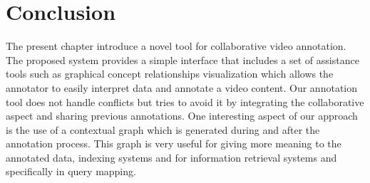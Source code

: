 \section{Conclusion}

The present chapter introduce a novel tool for collaborative video annotation. The proposed system provides a simple interface that includes a set of assistance tools such as graphical concept relationships visualization which allows the annotator to easily interpret data and annotate a video content. Our annotation tool does not handle conflicts but tries to avoid it by integrating the collaborative aspect and sharing previous annotations. 
One interesting aspect of our approach is the use of a contextual graph which is generated during and after the annotation process. This graph is very useful for giving more meaning to the annotated data, indexing systems and for information retrieval systems and specifically in query mapping.



		


